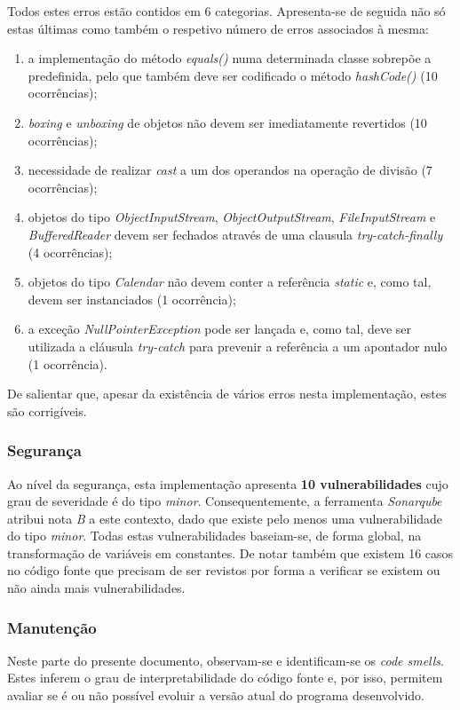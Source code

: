 \documentclass[a4paper]{report}
\begin{document}
Todos estes erros estão contidos em 6 categorias. Apresenta-se de seguida não só estas últimas como também o respetivo número de erros associados à mesma:
\begin{enumerate}
    \item a implementação do método \textit{equals()} numa determinada classe sobrepõe a predefinida, pelo que também deve ser codificado o método \textit{hashCode()} (10 ocorrências);
    \item \textit{boxing} e \textit{unboxing} de objetos não devem ser imediatamente revertidos (10 ocorrências);
    \item necessidade de realizar \textit{cast} a um dos operandos na operação de divisão (7 ocorrências);
    \item objetos do tipo \textit{ObjectInputStream}, \textit{ObjectOutputStream}, \textit{FileInputStream} e \textit{BufferedReader} devem ser fechados através de uma clausula \textit{try-catch-finally} (4 ocorrências);
    \item objetos do tipo \textit{Calendar} não devem conter a referência \textit{static} e, como tal, devem ser instanciados (1 ocorrência);
    \item a exceção \textit{NullPointerException} pode ser lançada e, como tal, deve ser utilizada a cláusula \textit{try-catch} para prevenir a referência a um apontador nulo (1 ocorrência).
\end{enumerate}

\par De salientar que, apesar da existência de vários erros nesta implementação, estes são corrigíveis.

\subsubsection{Segurança}
Ao nível da segurança, esta implementação apresenta \textbf{10 vulnerabilidades} cujo grau de severidade é do tipo \textit{minor}. Consequentemente, a ferramenta \textit{Sonarqube} atribui nota \textit{B} a este contexto, dado que existe pelo menos uma vulnerabilidade do tipo \textit{minor}. Todas estas vulnerabilidades baseiam-se, de forma global, na transformação de variáveis em constantes. De notar também que existem 16 casos no código fonte que precisam de ser revistos por forma a verificar se existem ou não ainda mais vulnerabilidades.

\subsubsection{Manutenção}
Neste parte do presente documento, observam-se e identificam-se os \textit{code smells}. Estes inferem o grau de interpretabilidade do código fonte e, por isso, permitem avaliar se é ou não possível evoluir a versão atual do programa desenvolvido.
\end{document}
